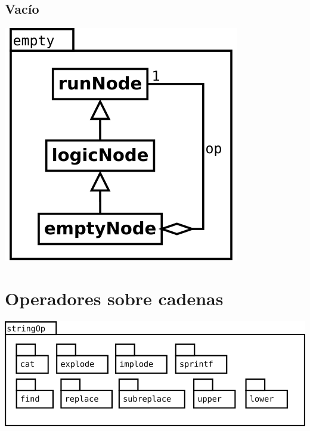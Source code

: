 \subsection {Vacío}
\begin{center}
\includegraphics[scale=0.4]{empty.png} \\
\end{center}


\pagebreak
\section {Operadores sobre cadenas}
\begin{center}
\includegraphics[scale=0.4]{stringOp-package.png} \\
\end{center}

